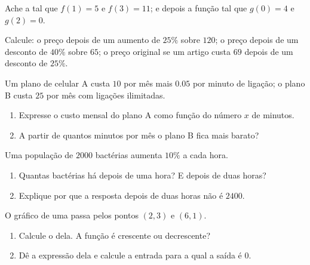 \begin{exercise}[$\star$]\label{exo:g9:linfunc:5}
Ache a  tal que $f(1) = 5$ e $f(3) = 11$; e depois a função
tal que $g(0) = 4$ e $g(2) = 0$.
\end{exercise}

\begin{exercise}[$\star\star$]\label{exo:g9:linfunc:6}
Calcule: o preço depois de um aumento de $25\%$ sobre $120$; o preço
depois de um desconto de $40\%$ sobre $65$; o preço original se um
artigo custa $69$ depois de um desconto de $25\%$.
\end{exercise}

\begin{exercise}[$\star\star$]\label{exo:g9:linfunc:7}
Um plano de celular A custa $10$ por mês mais $0.05$ por minuto de
ligação; o plano B custa $25$ por mês com ligações ilimitadas.
\begin{enumerate}
  \item Expresse o custo mensal do plano A como função do número $x$ de
        minutos.
  \item A partir de quantos minutos por mês o plano B fica mais barato?
\end{enumerate}
\end{exercise}

\begin{exercise}[$\star\star$]\label{exo:g9:linfunc:8}
Uma população de $2000$ bactérias aumenta $10\%$ a cada hora.
\begin{enumerate}
  \item Quantas bactérias há depois de uma hora? E depois de duas
        horas?
  \item Explique por que a resposta depois de duas horas não é $2400$.
\end{enumerate}
\end{exercise}

\begin{exercise}[$\star\star$]\label{exo:g9:linfunc:9}
O gráfico de uma  passa pelos pontos $(2, 3)$ e $(6, 1)$.
\begin{enumerate}
  \item Calcule o  dela. A função é crescente ou
        decrescente?
  \item Dê a expressão dela e calcule a entrada para a qual a saída é
        $0$.
\end{enumerate}
\end{exercise}

